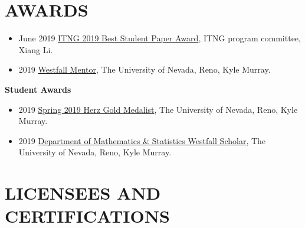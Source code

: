 \documentclass[paper=a4,fontsize=11pt]{scrartcl} %
\newcommand{\NewPart}[2]{\section*{\uppercase{#1} #2 }}
\begin{document}

 

\NewPart{Awards}{}
\vspace{-7pt}

\begin{itemize}[noitemsep]
      \item June 2019 \href{https://http://www.itng.info/}{ITNG 2019 Best Student Paper Award}, ITNG program committee, Xiang Li.
    \item 2019 \href{https://www.unr.edu/science/student-resources/student-competitions-awards}{Westfall Mentor}, The University of Nevada, Reno, Kyle Murray.
\end{itemize}

\textbf{Student Awards}

\begin{itemize}[noitemsep]
\item 2019 \href{https://www.unr.edu/nevada-today/news/2019/spring-2019-herz-gold-medalist?utm_source=newsletter051619&utm_medium=email&utm_content=kylemurray&utm_campaign=NevadaWeekly}{Spring 2019 Herz Gold Medalist}, The University of Nevada, Reno, Kyle Murray.
  \item 2019 \href{https://www.unr.edu/science/student-resources/student-competitions-awards}{Department of Mathematics \& Statistics Westfall Scholar}, The University of Nevada, Reno, Kyle Murray.

\vspace{-7pt}
\end{itemize}  



\NewPart{Licensees and Certifications}{}
\vspace{-7pt}
\end{document}
